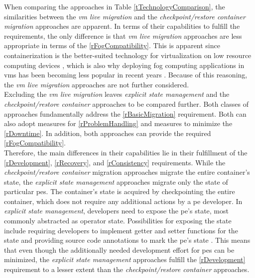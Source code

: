 When comparing the approaches in Table \ref{tTechnologyComparison}, the similarities between the \textit{\gls{vm} live migration} and the \textit{checkpoint/restore container migration} approaches are apparent. In terms of their capabilities to fulfill the requirements, the only difference is that \textit{\gls{vm} live migration} approaches are less appropriate in terms of the \ref{rFogCompatibility}. This is apparent since containerization is the better-suited technology for virtualization on low resource computing devices \cite{Jalali.2016}, which is also why deploying fog computing applications in \gls{vm}s has been becoming less popular in recent years \cite{Puliafito.2018}. Because of this reasoning, the \textit{\gls{vm} live migration} approaches are not further considered.\\
Excluding the \textit{\gls{vm} live migration} leaves \textit{explicit state management} and the \textit{checkpoint/restore container} approaches to be compared further. Both classes of approaches fundamentally address the \ref{rBasicMigration} requirement. Both can also adopt measures for \ref{rProblemHandling} and measures to minimize the \ref{rDowntime}. In addition, both approaches can provide the required \ref{rFogCompatibility}.\\ 
Therefore, the main differences in their capabilities lie in their fulfillment of the \ref{rDevelopment}, \ref{rRecovery}, and \ref{rConsistency} requirements. While the \textit{checkpoint/restore container} migration approaches migrate the entire container's state, the \textit{explicit state management} approaches migrate only the state of particular \gls{pe}s. The container's state is acquired by checkpointing the entire container, which does not require any additional actions by a \gls{pe} developer. In \textit{explicit state management}, developers need to expose the \gls{pe}'s state, most commonly abstracted as operator state. Possibilities for exposing the state include requiring developers to implement getter and setter functions for the state \cite{CastroFernandez.2013, Saurez.2016} and providing source code annotations to mark the \gls{pe}'s state \cite{Gibson.2014}. This means that even though the additionally needed development effort for \gls{pe}s can be minimized, the \textit{explicit state management} approaches fulfill the \ref{rDevelopment} requirement to a lesser extent than the \textit{checkpoint/restore container} approaches.\\
